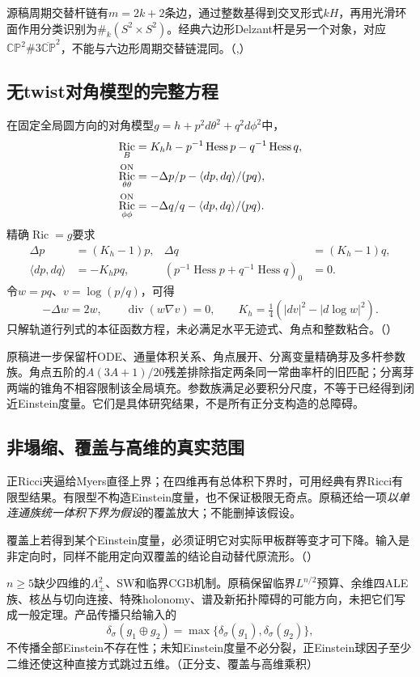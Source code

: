 \documentclass[UTF8,fontset=fandol,zihao=-4]{ctexart}
\theoremstyle{research}
\DeclareMathOperator{\Ric}{Ric}
\DeclareMathOperator{\diver}{div}
\DeclareMathOperator{\Hess}{Hess}
\newcommand{\CP}{\mathbb{CP}}
\numberwithin{equation}{section}
\begin{document}
源稿周期交替杆链有$m=2k+2$条边，通过整数基得到交叉形式$kH$，再用光滑环面作用分类识别为$\#_k(S^2\times S^2)$。经典六边形Delzant杆是另一个对象，对应$\CP^2\#3\overline{\CP}^2$，不能与六边形周期交替链混同。\cite{G}（,）\cite{OR}

\subsection{无twist对角模型的完整方程}
在固定全局圆方向的对角模型$g=h+p^2d\theta^2+q^2d\phi^2$中，
\begin{align}
\Ric_B&=K_hh-p^{-1}\Hess p-q^{-1}\Hess q,\\
\Ric_{\theta\theta}^{\rm ON}&=-\Delta p/p-\langle dp,dq\rangle/(pq),\\
\Ric_{\phi\phi}^{\rm ON}&=-\Delta q/q-\langle dp,dq\rangle/(pq).
\end{align}
精确$\Ric=g$要求
\begin{align}
\Delta p&=(K_h-1)p,&\Delta q&=(K_h-1)q,\\
\langle dp,dq\rangle&=-K_hpq,&
(p^{-1}\Hess p+q^{-1}\Hess q)_0&=0.
\end{align}
令$w=pq$、$v=\log(p/q)$，可得
\[
-\Delta w=2w,\qquad\diver(w\nabla v)=0,
\qquad K_h=\tfrac14(|dv|^2-|d\log w|^2).
\]
只解轨道行列式的本征函数方程，未必满足水平无迹式、角点和整数粘合。\cite{G}（）

原稿进一步保留杆ODE、通量体积关系、角点展开、分离变量精确芽及多杆参数族。角点五阶的$A(3A+1)/20$残差排除指定两条同一常曲率杆的旧匹配；分离芽两端的锥角不相容限制该全局填充。参数族满足必要积分尺度，不等于已经得到闭近Einstein度量。它们是具体研究结果，不是所有正分支构造的总障碍。

\subsection{非塌缩、覆盖与高维的真实范围}
正Ricci夹逼给Myers直径上界；在四维再有总体积下界时，可用经典有界Ricci有限型结果。有限型不构造Einstein度量，也不保证极限无奇点。原稿还给一项\emph{以单连通族统一体积下界为假设}的覆盖放大；不能删掉该假设。

覆盖上若得到某个Einstein度量，必须证明它对实际甲板群等变才可下降。输入是非定向时，同样不能用定向双覆盖的结论自动替代原流形。\cite{C}（）\cite{CN}

$n\ge5$缺少四维的$\Lambda^2_\pm$、SW和临界CGB机制。原稿保留临界$L^{n/2}$预算、余维四ALE族、核丛与切向连接、特殊holonomy、谱及新拓扑障碍的可能方向，未把它们写成一般定理。产品传播只给输入的
\[
\delta_\sigma(g_1\oplus g_2)=\max\{\delta_\sigma(g_1),\delta_\sigma(g_2)\},
\]
不传播全部Einstein不存在性；未知Einstein度量不必分裂，正Einstein球因子至少二维还使这种直接方式跳过五维。\cite{G}（正分支、覆盖与高维乘积）
\end{document}
